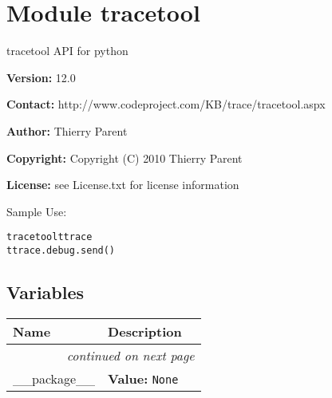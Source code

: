 %
%
%


\section{Module tracetool}

    \label{tracetool}
tracetool API for python

\textbf{Version:} 12.0



\textbf{Contact:} http://www.codeproject.com/KB/trace/tracetool.aspx



\textbf{Author:} Thierry Parent



\textbf{Copyright:} Copyright (C) 2010 Thierry Parent



\textbf{License:} see License.txt for license information

Sample Use:

\begin{alltt}
\pysrcprompt{{\textgreater}{\textgreater}{\textgreater} } tracetool  ttrace
\pysrcprompt{{\textgreater}{\textgreater}{\textgreater} }ttrace.debug.send ()\end{alltt}




  \subsection{Variables}

    \vspace{-1cm}
\hspace{\varindent}\begin{longtable}{|p{\varnamewidth}|p{\vardescrwidth}|l}
\cline{1-2}
\cline{1-2} \centering \textbf{Name} & \centering \textbf{Description}& \\
\cline{1-2}
\endhead\cline{1-2}\multicolumn{3}{r}{\small\textit{continued on next page}}\\\endfoot\cline{1-2}
\endlastfoot\raggedright \_\-\_\-p\-a\-c\-k\-a\-g\-e\-\_\-\_\- & \raggedright \textbf{Value:} 
{\tt None}&\\
\cline{1-2}
\end{longtable}


